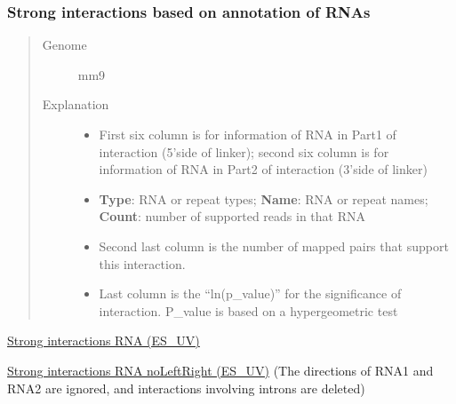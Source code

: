 \documentclass[letterpaper,10pt,english]{sphinxmanual}
\begin{document}
\subsubsection{Strong interactions based on annotation of RNAs}
\label{Data_Resources:strong-interactions-based-on-annotation-of-rnas}\begin{quote}\begin{description}
\item[{Genome}] \leavevmode
mm9

\item[{Explanation}] \leavevmode\begin{itemize}
\item {} 
First six column is for information of RNA in Part1 of interaction (5'side of linker); second six column is for information of RNA in Part2 of interaction (3'side of linker)

\item {} 
\textbf{Type}: RNA or repeat types; \textbf{Name}: RNA or repeat names; \textbf{Count}: number of supported reads in that RNA

\item {} 
Second last column is the number of mapped pairs that support this interaction.

\item {} 
Last column is the ``ln(p\_value)'' for the significance of interaction. P\_value is based on a hypergeometric test

\end{itemize}

\end{description}\end{quote}

\href{http://systemsbio.ucsd.edu/RNA-Hi-C/Data/ACCT\_GGCG\_interaction\_clusters\_RNA.xlsx}{Strong interactions RNA (ES\_UV)}

\href{http://systemsbio.ucsd.edu/RNA-Hi-C/Data/ACCT\_GGCG\_interaction\_clusters\_RNA\_noLeftRight.xlsx}{Strong interactions RNA noLeftRight (ES\_UV)} (The directions of RNA1 and RNA2 are ignored, and interactions involving introns are deleted)
\end{document}
